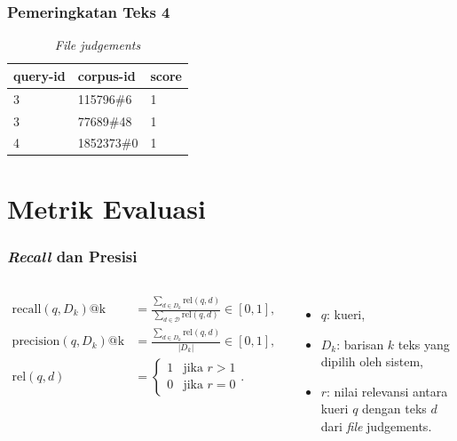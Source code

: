 \documentclass{beamer}
\newcommand{\f}[1]{\textit{#1}}
\begin{document}
\begin{frame}
\frametitle{Pemeringkatan Teks 4}

    \begin{table}[!ht]
        \centering
        \caption{\f{File judgements}}
        \label{tab:judgements-file-example}
        \begin{tabular}{|l|l|l|}
            \hline
            \textbf{query-id} & \textbf{corpus-id} & \textbf{score} \\ \hline
            3                 & 115796\#6          & 1              \\ \hline
            3                 & 77689\#48          & 1              \\ \hline
            4                 & 1852373\#0         & 1              \\ \hline
        \end{tabular}
    \end{table}
\end{frame}

\section{Metrik Evaluasi}

\begin{frame}
    \frametitle{\f{Recall} dan Presisi}
    \begin{columns}
        \begin{align*}
            \text{recall}(q, D_k)\text{@k} &= \frac{\sum_{d \in D_k} \text{rel}(q, d)}{\sum_{d \in \mathcal{D}} \text{rel}(q, d)} \in [0, 1], \\ 
            \text{precision}(q, D_k)\text{@k} &= \frac{\sum_{d \in D_k} \text{rel}(q, d)}{|D_k|} \in [0, 1], \\
            \text{rel}(q, d) &= \begin{cases} 
            1 & \text{jika } r > 1 \\
            0 & \text{jika } r = 0
            \end{cases}.
        \end{align*}

        \begin{itemize}
            \item $q$: kueri,
            \item $D_k$: barisan $k$ teks yang dipilih oleh sistem,
            \item $r$: nilai relevansi antara kueri $q$ dengan teks $d$ dari \f{file} judgements.
        \end{itemize}
    \end{columns}
\end{frame}
\end{document}
